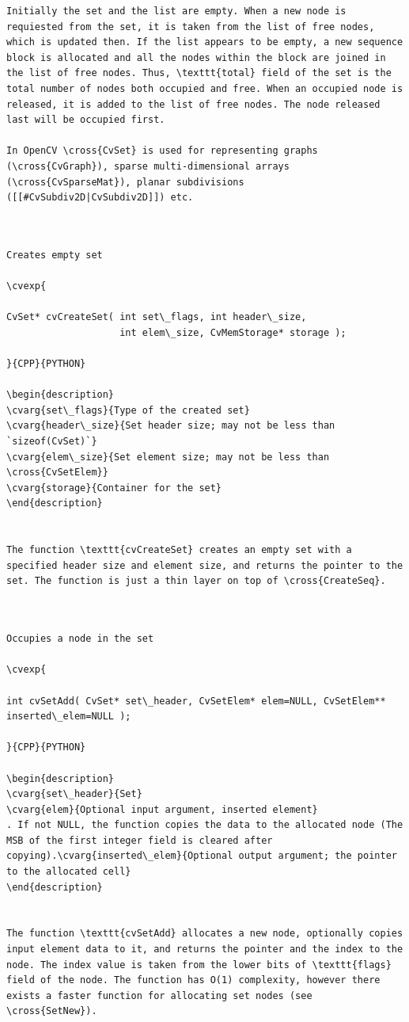 \begin{verbatim}
Initially the set and the list are empty. When a new node is requiested from the set, it is taken from the list of free nodes, which is updated then. If the list appears to be empty, a new sequence block is allocated and all the nodes within the block are joined in the list of free nodes. Thus, \texttt{total} field of the set is the total number of nodes both occupied and free. When an occupied node is released, it is added to the list of free nodes. The node released last will be occupied first.

In OpenCV \cross{CvSet} is used for representing graphs (\cross{CvGraph}), sparse multi-dimensional arrays (\cross{CvSparseMat}), planar subdivisions ([[#CvSubdiv2D|CvSubdiv2D]]) etc.


\end{verbatim}
\label{CreateSet}
\begin{verbatim}

Creates empty set

\cvexp{

CvSet* cvCreateSet( int set\_flags, int header\_size,
                    int elem\_size, CvMemStorage* storage );

}{CPP}{PYTHON}

\begin{description}
\cvarg{set\_flags}{Type of the created set}
\cvarg{header\_size}{Set header size; may not be less than `sizeof(CvSet)`}
\cvarg{elem\_size}{Set element size; may not be less than \cross{CvSetElem}}
\cvarg{storage}{Container for the set}
\end{description}


The function \texttt{cvCreateSet} creates an empty set with a specified header size and element size, and returns the pointer to the set. The function is just a thin layer on top of \cross{CreateSeq}.


\end{verbatim}
\label{SetAdd}
\begin{verbatim}

Occupies a node in the set

\cvexp{

int cvSetAdd( CvSet* set\_header, CvSetElem* elem=NULL, CvSetElem** inserted\_elem=NULL );

}{CPP}{PYTHON}

\begin{description}
\cvarg{set\_header}{Set}
\cvarg{elem}{Optional input argument, inserted element}
. If not NULL, the function copies the data to the allocated node (The MSB of the first integer field is cleared after copying).\cvarg{inserted\_elem}{Optional output argument; the pointer to the allocated cell}
\end{description}


The function \texttt{cvSetAdd} allocates a new node, optionally copies input element data to it, and returns the pointer and the index to the node. The index value is taken from the lower bits of \texttt{flags} field of the node. The function has O(1) complexity, however there exists a faster function for allocating set nodes (see \cross{SetNew}).


\end{verbatim}
